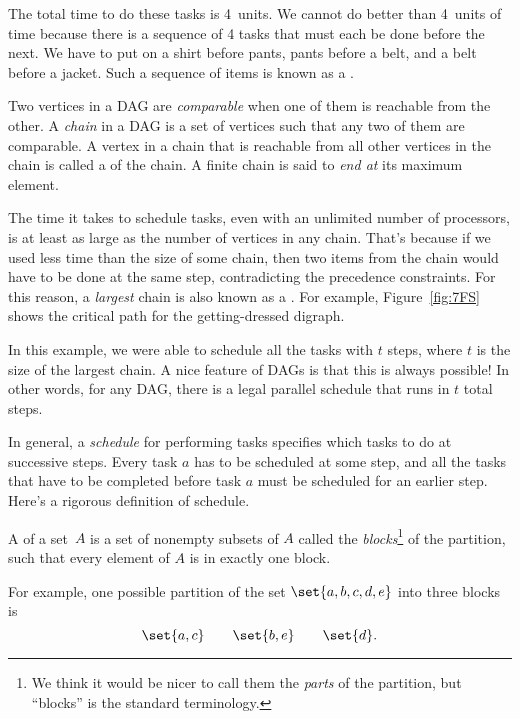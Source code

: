 The total time to do these tasks is 4~units.  We cannot do better than
4~units of time because there is a sequence of 4 tasks that must each
be done before the next.  We have to put on a shirt before pants,
pants before a belt, and a belt before a jacket.  Such a sequence of
items is known as a .

\begin{definition}
Two vertices in a DAG are \emph{comparable} when one of them is
reachable from the other.  A \emph{chain} in a DAG is a set of
vertices such that any two of them are comparable.  A vertex in a
chain that is reachable from all other vertices in the chain is called
a  of the chain.  A finite chain is said to
\emph{end at} its maximum element.
\end{definition}

The time it takes to schedule tasks, even with an unlimited number of
processors, is at least as large as the number of vertices in any
chain.  That's because if we used less time than the size of some
chain, then two items from the chain would have to be done at the same
step, contradicting the precedence constraints.  For this reason, a
\emph{largest} chain is also known as a .  For
example, Figure~\ref{fig:7FS} shows the critical path for the
getting-dressed digraph.

In this example, we were able to schedule all the tasks with $t$
steps, where $t$ is the size of the largest chain.  A nice feature of
DAGs is that this is always possible!  In other words, for any DAG,
there is a legal parallel schedule that runs in $t$ total steps.

In general, a \emph{schedule} for performing tasks specifies which
tasks to do at successive steps.  Every task $a$ has to be scheduled
at some step, and all the tasks that have to be completed before task
$a$ must be scheduled for an earlier step.  Here's a rigorous
definition of schedule.

\begin{definition}\label{def:partition}
A  of a set~$A$ is a set of nonempty subsets of $A$
called the \emph{blocks}\footnote{We think it would be nicer to call
  them the \emph{parts} of the partition, but ``blocks'' is the
  standard terminology.} of the partition, such that every element of
$A$ is in exactly one block.
\end{definition}

For example, one possible partition of the set $\set{a, b, c, d, e}$
into three blocks is
\[
\set{a, c} \qquad \set{b, e} \qquad \set{d}.
\]


